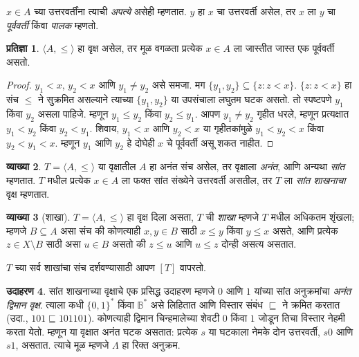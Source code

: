 \documentclass[11pt,a4paper,openany]{book}
\theoremstyle{definition}
\newtheorem{defn}{व्याख्या}[section]
\newtheorem{ex}[defn]{उदाहरण}
\newtheorem{prop}[defn]{प्रतिज्ञा}
\newcommand{\Setabs}[2]{\{#1:#2\}}
\newcommand{\tuple}[1]{\langle #1\rangle}
\newcommand{\Bin}{\mathbb{B}}
\newcommand{\emptyseq}{\Lambda}
\begin{document}
$x \in A$ च्या उत्तरवर्तींना त्याची \emph{अपत्ये} असेही म्हणतात.
$y$ हा $x$ चा उत्तरवर्ती असेल, तर $x$ ला $y$ चा \emph{पूर्ववर्ती}
किंवा \emph{पालक} म्हणतो.

\begin{prop}
$\tuple{A,\le}$ हा वृक्ष असेल, तर मूळ वगळता प्रत्येक $x \in A$ ला
जास्तीत जास्त एक पूर्ववर्ती असतो.
\end{prop}

\begin{proof}
  $y_1 < x$, $y_2 < x$ आणि $y_1 \neq y_2$ असे समजा. मग
  $\{y_1, y_2\} \subseteq \Setabs{z}{z<x}$. $\Setabs{z}{z<x}$ हा संच
  $\le$ ने सुक्रमित असल्याने त्याच्या $\{y_1, y_2\}$ या उपसंचाला लघुतम
  घटक असतो. तो स्पष्टपणे $y_1$ किंवा $y_2$ असला पाहिजे. म्हणून
  $y_1 \le y_2$ किंवा $y_2 \le y_1$. आपण $y_1 \neq y_2$ गृहीत धरले,
  म्हणून प्रत्यक्षात $y_1 < y_2$ किंवा $y_2 < y_1$. शिवाय,
  $y_1 < x$ आणि $y_2 < x$ या गृहीतकांमुळे $y_1 < y_2 < x$ किंवा
  $y_2 < y_1 < x$. म्हणून $y_1$ आणि $y_2$ हे दोघेही $x$ चे पूर्ववर्ती
  असू शकत नाहीत.
\end{proof}

\begin{defn}
$T = \tuple{A, \le}$ या वृक्षातील $A$ हा अनंत संच असेल, तर वृक्षाला
\emph{अनंत}, आणि अन्यथा \emph{सांत} म्हणतात. $T$ मधील प्रत्येक
$x \in A$ ला फक्त सांत संख्येने उत्तरवर्ती असतील, तर $T$ ला
\emph{सांत शाखनाचा} वृक्ष म्हणतात.
\end{defn}

\begin{defn}[शाखा]
$T = \tuple{A, \le}$ हा वृक्ष दिला असता, $T$ ची \emph{शाखा} म्हणजे
$T$ मधील अधिकतम शृंखला; म्हणजे $B \subseteq A$ असा संच की कोणत्याही
$x, y \in B$ साठी $x \le y$ किंवा $y \le x$ असते, आणि प्रत्येक
$z \in X \setminus B$ साठी असा $u \in B$ असतो की $z \le u$ आणि
$u \le z$ दोन्ही असत्य असतात.

$T$ च्या सर्व शाखांचा संच दर्शवण्यासाठी आपण $[T]$ वापरतो.
\end{defn}

\begin{ex}
सांत शाखनाच्या वृक्षाचे एक प्रसिद्ध उदाहरण म्हणजे $0$ आणि $1$ यांच्या
सांत अनुक्रमांचा \emph{अनंत द्विमान वृक्ष}. त्याला कधी $\{0,1\}^*$ किंवा
$\Bin^*$ असे लिहितात आणि विस्तार संबंध $\sqsubseteq$ ने क्रमित करतात
(उदा., $101 \sqsubseteq 101101$). कोणत्याही द्विमान चिन्हमालेच्या शेवटी
$0$ किंवा $1$ जोडून तिचा विस्तार नेहमी करता येतो. म्हणून या वृक्षात
अनंत घटक असतात: प्रत्येक $s$ या घटकाला नेमके दोन उत्तरवर्ती, $s0$ आणि
$s1$, असतात. त्याचे मूळ म्हणजे $\emptyseq$ हा रिक्त अनुक्रम.
\end{ex}
\end{document}
